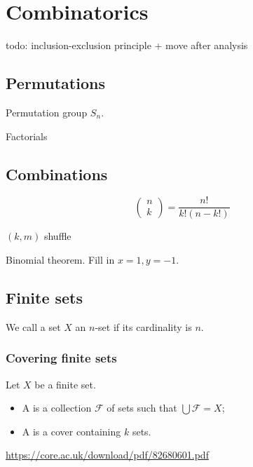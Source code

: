 \chapter{Combinatorics}
todo: inclusion-exclusion principle + move after analysis
\section{Permutations}
Permutation group $S_n$.

Factorials

\section{Combinations}

\[ \begin{pmatrix}
n \\ k
\end{pmatrix} = \frac{n!}{k!(n-k!)}\]


$(k,m)$ shuffle

Binomial theorem. Fill in $x=1, y=-1$.

\section{Finite sets}
\begin{definition}
We call a set $X$ an $n$-set if its cardinality is $n$.
\end{definition}

\subsection{Covering finite sets}
\begin{definition}
Let $X$ be a finite set.
\begin{itemize}
\item A  is a collection $\mathcal{F}$ of sets such that $\bigcup \mathcal{F} = X$;
\item A  is a cover containing $k$ sets.
\end{itemize}
\end{definition}

\url{https://core.ac.uk/download/pdf/82680601.pdf}